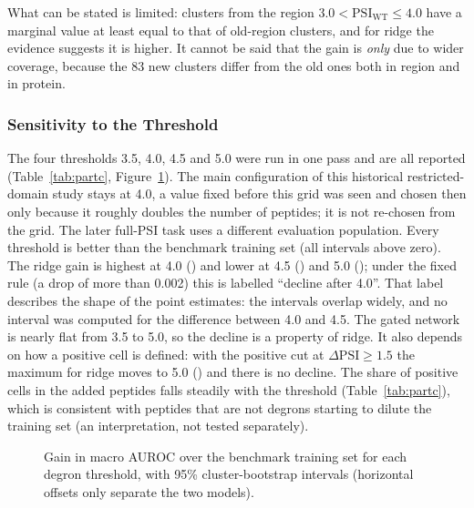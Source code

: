 What can be stated is limited: clusters from the region $3.0<\mathrm{PSI}_{\mathrm{WT}}\le4.0$ have a marginal value at least equal
to that of old-region clusters, and for ridge the evidence suggests it is higher. It cannot be said that the gain is
\emph{only} due to wider coverage, because the 83 new clusters differ from the old ones both in region and in protein.

\subsubsection{Sensitivity to the Threshold}\label{sec:res-partc}
The four thresholds 3.5, 4.0, 4.5 and 5.0 were run in one pass and are all reported (Table~\ref{tab:partc},
Figure~\ref{fig:threshold}). The main configuration of this historical restricted-domain study stays at 4.0,
a value fixed before this grid was seen and chosen then only because it roughly doubles the number of
peptides; it is not re-chosen from the grid. The later full-PSI task uses a different evaluation population.
Every threshold is better than the benchmark training set (all intervals above zero). The ridge gain is highest at 4.0
(\nCFourD) and lower at 4.5 (\nCFourFiveD) and 5.0 (\nCFiveD); under the fixed rule (a drop of more than 0.002) this
is labelled ``decline after 4.0''. That label describes the shape of the point estimates: the intervals overlap
widely, and no interval was computed for the difference between 4.0 and 4.5. The gated network is nearly flat
from 3.5 to 5.0, so the decline is a property of ridge. It also depends on how a positive cell is defined: with
the positive cut at $\Delta\mathrm{PSI}\ge1.5$ the maximum for ridge moves to 5.0 (\nCAtOneFiveFive) and there is no decline.
The share of positive cells in the added peptides falls steadily with the threshold (Table~\ref{tab:partc}),
which is consistent with peptides that are not degrons starting to dilute the training set (an interpretation, not tested separately).

\begin{table}[htbp]
  \centering
  \caption[Added data and gains for each degron threshold (cov80, positive cut $\Delta\mathrm{PSI}\ge1$)]{Added data and gains for each degron threshold (cov80, positive cut $\Delta\mathrm{PSI}\ge1$)}\label{tab:partc}
  
\end{table}

\begin{figure}[htbp]
  \centering
  
  \caption[Gain in macro AUROC over the benchmark training set for each degron threshold]{Gain in macro AUROC over the benchmark training set for each degron threshold, with 95\% cluster-bootstrap
  intervals (horizontal offsets only separate the two models).}\label{fig:threshold}
\end{figure}

